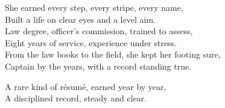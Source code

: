 \begin{lyrics}
She earned every step, every stripe, every name,\\
Built a life on clear eyes and a level aim.\\
Law degree, officer’s commission, trained to assess,\\
Eight years of service, experience under stress.\\
From the law books to the field, she kept her footing sure,\\
Captain by the years, with a record standing true.

A rare kind of résumé, earned year by year,\\
A disciplined record, steady and clear.
\end{lyrics}

